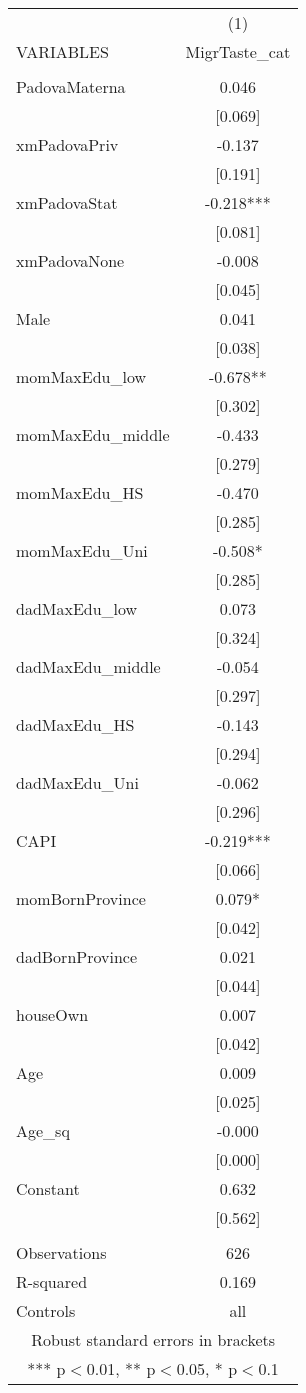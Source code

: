\documentclass[]{article}
\begin{document}
\begin{tabular}{lc} \hline
 & (1) \\
VARIABLES & MigrTaste\_cat \\ \hline
 &  \\
PadovaMaterna & 0.046 \\
 & [0.069] \\
xmPadovaPriv & -0.137 \\
 & [0.191] \\
xmPadovaStat & -0.218*** \\
 & [0.081] \\
xmPadovaNone & -0.008 \\
 & [0.045] \\
Male & 0.041 \\
 & [0.038] \\
momMaxEdu\_low & -0.678** \\
 & [0.302] \\
momMaxEdu\_middle & -0.433 \\
 & [0.279] \\
momMaxEdu\_HS & -0.470 \\
 & [0.285] \\
momMaxEdu\_Uni & -0.508* \\
 & [0.285] \\
dadMaxEdu\_low & 0.073 \\
 & [0.324] \\
dadMaxEdu\_middle & -0.054 \\
 & [0.297] \\
dadMaxEdu\_HS & -0.143 \\
 & [0.294] \\
dadMaxEdu\_Uni & -0.062 \\
 & [0.296] \\
CAPI & -0.219*** \\
 & [0.066] \\
momBornProvince & 0.079* \\
 & [0.042] \\
dadBornProvince & 0.021 \\
 & [0.044] \\
houseOwn & 0.007 \\
 & [0.042] \\
Age & 0.009 \\
 & [0.025] \\
Age\_sq & -0.000 \\
 & [0.000] \\
Constant & 0.632 \\
 & [0.562] \\
 &  \\
Observations & 626 \\
R-squared & 0.169 \\
 Controls & all \\ \hline
\multicolumn{2}{c}{ Robust standard errors in brackets} \\
\multicolumn{2}{c}{ *** p$<$0.01, ** p$<$0.05, * p$<$0.1} \\
\end{tabular}
\end{document}
